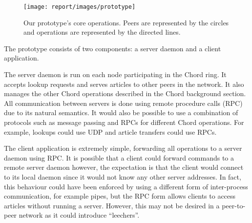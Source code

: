 \documentclass[twocolumn]{article}
\begin{document}
\begin{figure}[tbh!]
  \centering
  \texttt{[image: report/images/prototype]}
  \caption{Our prototype's core operations. Peers are represented by the circles and operations are represented by the directed lines. \label{fig:prototype}}
\end{figure}

The prototype consists of two components: a server daemon and a client application.

The server daemon is run on each node participating in the Chord ring. It accepts lookup requests and serves articles to other peers in the network. It also manages the other Chord operations described in the Chord background section. All communication between servers is done using remote procedure calls (RPC) due to its natural semantics. It would also be possible to use a combination of protocols such as message passing and RPCs for different Chord operations. For example, lookups could use UDP and article transfers could use RPCs.

The client application is extremely simple, forwarding all operations to a server daemon using RPC. It is possible that a client could forward commands to a remote server daemon however, the expectation is that the client would connect to its local daemon since it would not know any other server addresses. In fact, this behaviour could have been enforced by using a different form of inter-process communication, for example pipes, but the RPC form allows clients to access articles without running a server. However, this may not be desired in a peer-to-peer network as it could introduce “leechers”.
\end{document}
